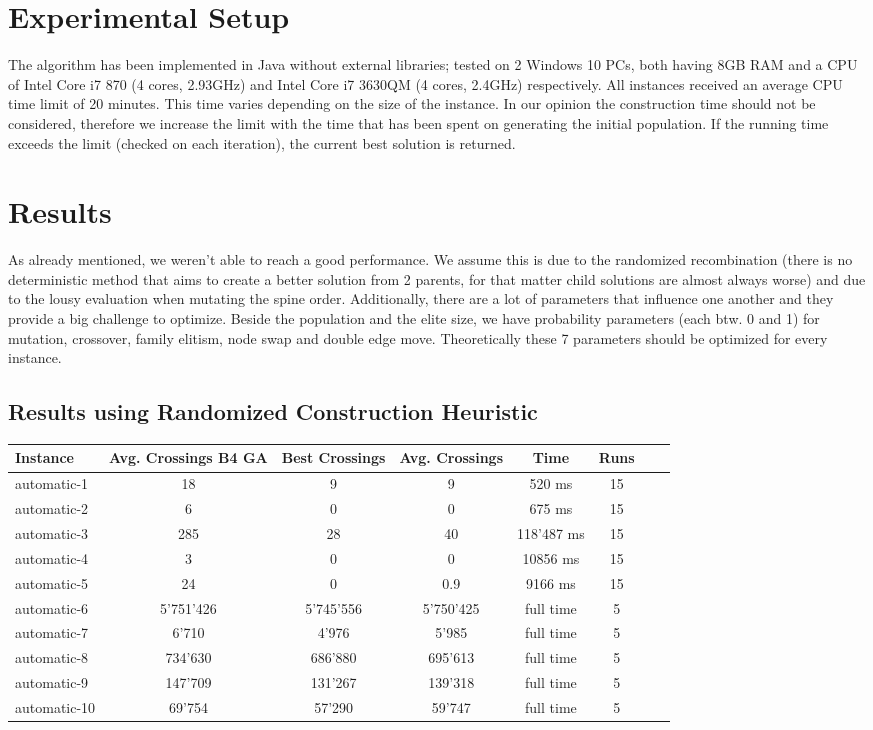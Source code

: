 \documentclass[11pt]{article}
\begin{document}
\section{Experimental Setup}
\hspace{0.5cm}The algorithm has been implemented in Java without external libraries; tested on 2 Windows 10 PCs, both having 8GB RAM and a CPU of Intel Core i7 870 (4 cores, 2.93GHz) and Intel Core i7 3630QM (4 cores, 2.4GHz) respectively. All instances received an average CPU time limit of 20 minutes. This time varies depending on the size of the instance. In our opinion the construction time should not be considered, therefore we increase the limit with the time that has been spent on generating the initial population.  If the running time exceeds the limit (checked on each iteration), the current best solution is returned. 

\section{Results}
\hspace{0.5cm}As already mentioned, we weren't able to reach a good performance. We assume this is due to the randomized recombination (there is no deterministic method that aims to create a better solution from 2 parents, for that matter child solutions are almost always worse) and due to the lousy evaluation when mutating the spine order. Additionally, there are a lot of parameters that influence one another and they provide a big challenge to optimize. Beside the population and the elite size, we have probability parameters (each btw. 0 and 1) for mutation, crossover, family elitism, node swap and double edge move. Theoretically these 7 parameters should be optimized for every instance.\\

\subsection{Results using Randomized Construction Heuristic}

\begin{tabular}{l*{6}{c}r}
	Instance & Avg. Crossings B4 GA & Best Crossings & Avg. Crossings & Time & Runs \\
	\hline
	automatic-1 & 18 & 9 & 9 & 520 ms & 15 \\
	automatic-2 & 6 & 0 & 0 & 675 ms & 15 \\
	automatic-3 & 285 & 28 & 40 & 118'487 ms & 15 \\
	automatic-4 & 3 & 0 & 0 & 10856 ms & 15 \\
	automatic-5 & 24 & 0 & 0.9 & 9166 ms & 15 \\
	automatic-6 & 5'751'426 & 5'745'556 & 5'750'425 & full time & 5 \\
	automatic-7 & 6'710 & 4'976 & 5'985 & full time & 5 \\
	automatic-8 & 734'630 & 686'880 & 695'613 & full time & 5  \\
	automatic-9 & 147'709 & 131'267 & 139'318 & full time & 5 \\
	automatic-10 & 69'754 & 57'290 & 59'747 & full time & 5  \\
\end{tabular}
\end{document}
